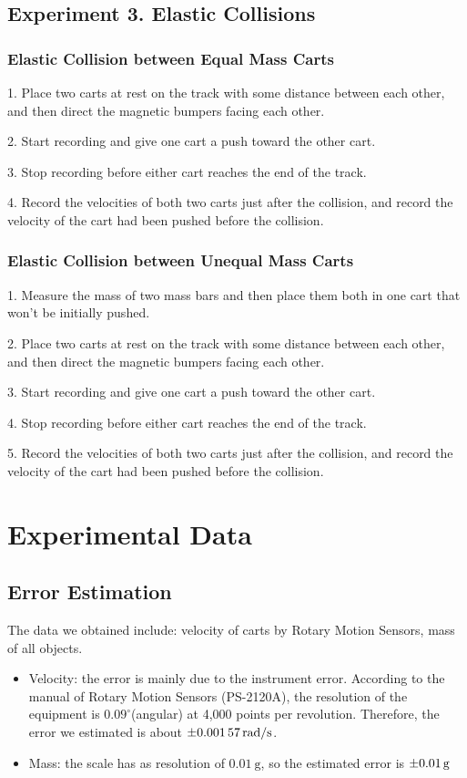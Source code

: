 \documentclass[12pt]{article}
\begin{document}
	\subsection{Experiment 3. Elastic Collisions}
		\subsubsection{Elastic Collision between Equal Mass Carts}
		1. Place two carts at rest on the track with some distance between each other, and then direct the magnetic bumpers facing each other. \par 
		2. Start recording and give one cart a push toward the other cart. \par 
		3. Stop recording before either cart reaches the end of the track. \par 
		4. Record the velocities of both two carts just after the collision, and record the velocity of the cart had been pushed before the collision. \par 
	    \subsubsection{Elastic Collision between Unequal Mass Carts}
	    1. Measure the mass of two mass bars and then place them both in one cart that won't be initially pushed. \par 
	    2. Place two carts at rest on the track with some distance between each other, and then direct the magnetic bumpers facing each other. \par 
	    3. Start recording and give one cart a push toward the other cart. \par 
	    4. Stop recording before either cart reaches the end of the track. \par 
	    5. Record the velocities of both two carts just after the collision, and record the velocity of the cart had been pushed before the collision. \par 
	 
	\section{Experimental Data}
	\subsection{Error Estimation}
	The data we obtained include: velocity of carts by Rotary Motion Sensors, mass of all objects.
		\begin{itemize}
			\item Velocity: the error is mainly due to the instrument error. According to the manual of Rotary Motion Sensors (PS-2120A), the resolution of the equipment is $0.09^\circ$(angular) at 4,000 points per revolution. Therefore, the error we estimated is about $\SI{\pm0.00157}{{\radian}/{\second}}$.
			\item Mass: the scale has as resolution of $\SI{0.01}{\gram}$, so the estimated error is $\SI{\pm0.01}{\gram}$ 
		\end{itemize}
\end{document}
